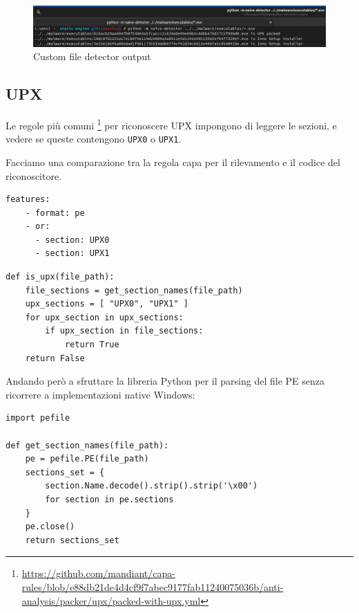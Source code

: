 \begin{figure}[h!]
    \centering
    \includegraphics[scale=0.34]{assets/custom_file_detector_output.png}
    \caption{Custom file detector output}
\end{figure}

\subsection{UPX}
Le regole più comuni
\footnote{\url{https://github.com/mandiant/capa-rules/blob/e88db21de4d4cf9f7abec9177fab11240075036b/anti-analysis/packer/upx/packed-with-upx.yml}}
per riconoscere UPX impongono di leggere le sezioni, e vedere se queste contengono \texttt{UPX0} o \texttt{UPX1}.

Facciamo una comparazione tra la regola capa per il rilevamento e il codice del riconoscitore.

\noindent\begin{minipage}{.35\textwidth}
       \begin{verbatim}
features:
    - format: pe
    - or:
      - section: UPX0
      - section: UPX1
       \end{verbatim}
\end{minipage}
\begin{minipage}{.4\textwidth}
       \begin{verbatim}
def is_upx(file_path):
    file_sections = get_section_names(file_path)
    upx_sections = [ "UPX0", "UPX1" ]
    for upx_section in upx_sections:
        if upx_section in file_sections:
            return True
    return False
       \end{verbatim}
\end{minipage}

\bigskip

Andando però a sfruttare la libreria Python per il parsing del file PE senza ricorrere a implementazioni native Windows:

\begin{verbatim}
import pefile

def get_section_names(file_path):
    pe = pefile.PE(file_path)
    sections_set = {
        section.Name.decode().strip().strip('\x00')
        for section in pe.sections
    }
    pe.close()
    return sections_set
\end{verbatim}

